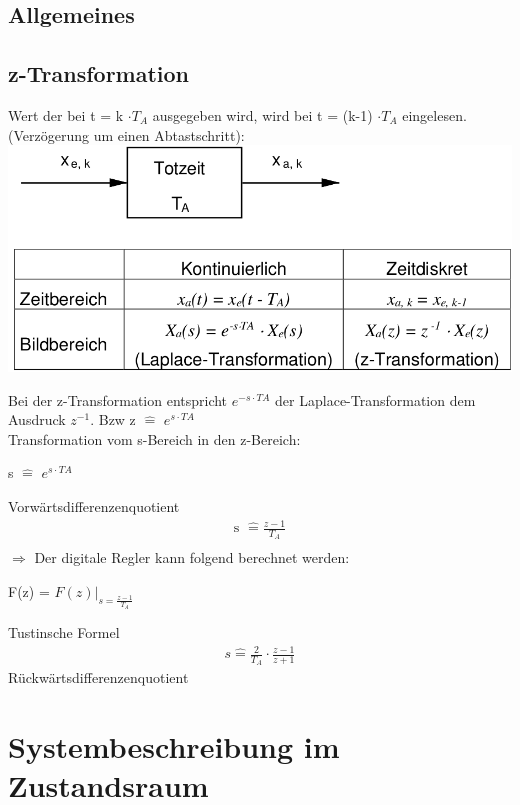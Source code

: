 \documentclass[10pt,a4paper]{article}
\begin{document}
    \subsection{Allgemeines}
    \subsection{z-Transformation}
    Wert der bei t = k $\cdot T_A$ ausgegeben wird, wird bei t = (k-1) $\cdot T_A$ eingelesen.
    (Verzögerung um einen Abtastschritt):\\
    \includegraphics[width=.45\textwidth]{Figures/zTrans.png}

    Bei der z-Transformation entspricht $e^{-s \cdot TA}$ der
    Laplace-Transformation dem Ausdruck
    $z^{-1}$. Bzw z $\hat{=}$ $e^{s \cdot TA}$\\
    Transformation vom s-Bereich in den z-Bereich:
    \begin{center}
    s $\hat{=}$ $e^{s \cdot TA}$
    \end{center}
    Vorwärtsdifferenzenquotient\\
    \begin{align*}
    \text{s } \hat{=} \frac{z-1}{T_A}\\
    \end{align*}
    $\Rightarrow$
    Der digitale Regler kann folgend berechnet werden:\\
    \begin{center}
    F(z) = $F(z)|_{s= \frac {z-1}{T_A}}$\\
    \end{center}
    Tustinsche Formel
    \begin{align*}
        s \hat{=} \frac{2}{T_A} \cdot \frac{z-1}{z+1}
    \end{align*}
    Rückwärtsdifferenzenquotient
  \section{Systembeschreibung im Zustandsraum}
\end{document}
